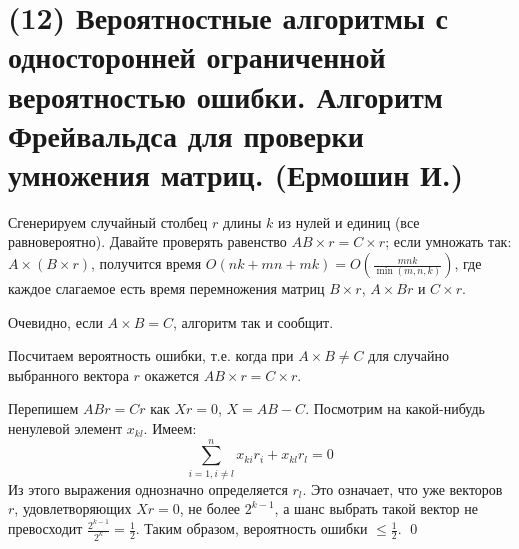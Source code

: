 \hypertarget{Freivalds}{}
\section{(12) Вероятностные алгоритмы с односторонней ограниченной вероятностью ошибки. Алгоритм Фрейвальдса для проверки умножения матриц. (Ермошин И.)}





Сгенерируем случайный столбец $r$ длины $k$ из нулей и единиц (все равновероятно). Давайте проверять равенство $AB\times r=C\times r$; если умножать так: $A\times (B\times r)$, получится время $O(nk+mn+mk)=O\left(\frac{mnk}{\min(m,n,k)}\right)$, где каждое слагаемое есть время перемножения матриц $B\times r$, $A \times Br$ и $C\times r$.


Очевидно, если $A\times B=C$, алгоритм так и сообщит.

Посчитаем вероятность ошибки, т.е. когда при $A\times B \neq C$ для случайно выбранного вектора $r$ окажется $AB\times r = C\times r$.

Перепишем $ABr = Cr$ как $Xr=0$, $X=AB-C$. Посмотрим на какой-нибудь ненулевой элемент $x_{kl}$. Имеем:
$$\sum_{i=1, i\ne l}^{n} x_{ki}r_i+x_{kl}r_l=0$$
Из этого выражения однозначно определяется $r_l$. Это означает, что уже векторов $r$, удовлетворяющих $Xr=0$, не более $2^{k-1}$, а шанс выбрать такой вектор не превосходит $\frac{2^{k-1}}{2^k} = \frac{1}{2}$. Таким образом, вероятность ошибки $\le\frac{1}{2}$. \qed

